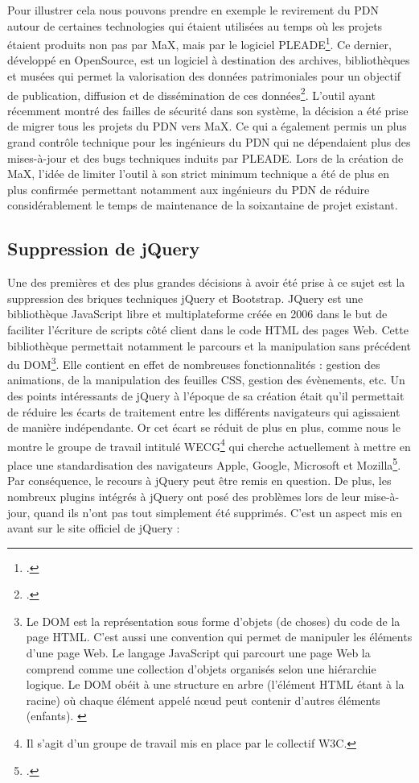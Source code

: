 \documentclass[a4paper,12pt,twoside]{book}
\begin{document}
Pour illustrer cela nous pouvons prendre en exemple le revirement du \acrshort{PDN} autour de certaines technologies qui étaient utilisées au temps où les projets étaient produits non pas par MaX, mais par le logiciel PLEADE\footcite{pleade}. Ce dernier, développé en OpenSource, est un logiciel à destination des archives, bibliothèques et musées qui permet la valorisation des données patrimoniales pour un objectif de publication, diffusion et de dissémination de ces données\footcite{pleade}. L'outil ayant récemment montré des failles de sécurité dans son système, la décision a été prise de migrer tous les projets du \acrshort{PDN} vers MaX. Ce qui a également permis un plus grand contrôle technique pour les ingénieurs du \acrshort{PDN} qui ne dépendaient plus des mises-à-jour et des bugs techniques induits par PLEADE. Lors de la création de MaX, l'idée de limiter l'outil à son strict minimum technique a été de plus en plus confirmée permettant notamment aux ingénieurs du \acrshort{PDN} de réduire considérablement le temps de maintenance de la soixantaine de projet existant.

\subsection{Suppression de jQuery}
Une des premières et des plus grandes décisions à avoir été prise à ce sujet est la suppression des briques techniques jQuery et Bootstrap. JQuery est une bibliothèque JavaScript libre et multiplateforme créée en 2006 dans le but de faciliter l'écriture de scripts côté client dans le code \acrshort{HTML} des pages Web. Cette bibliothèque permettait notamment le parcours et la manipulation sans précédent du \acrfull{DOM}\footnote{Le DOM est la représentation sous forme d'objets (de choses) du code de la page \acrshort{HTML}. C'est aussi une convention qui permet de manipuler les éléments d'une page Web. Le langage JavaScript qui parcourt une page Web la comprend comme une collection d'objets organisés selon une hiérarchie logique. Le DOM obéit à une structure en arbre (l'élément \acrshort{HTML} étant à la racine) où chaque élément appelé n\oe{}ud peut contenir d'autres éléments (enfants). \cite{dom_2020}}. Elle contient en effet de nombreuses fonctionnalités : gestion des animations, de la manipulation des feuilles CSS, gestion des évènements, etc. Un des points intéressants de jQuery à l'époque de sa création était qu'il permettait de réduire les écarts de traitement entre les différents navigateurs qui agissaient de manière indépendante. Or cet écart se réduit de plus en plus, comme nous le montre le groupe de travail intitulé
\acrfull{WECG}\footnote{Il s'agit d'un groupe de travail mis en place par le collectif W3C.} qui cherche actuellement à mettre en place une standardisation des navigateurs Apple, Google, Microsoft et Mozilla\footcite{webextensions}. Par conséquence, le recours à jQuery peut être remis en question. De plus, les nombreux plugins intégrés à jQuery ont posé des problèmes lors de leur mise-à-jour, quand ils n'ont pas tout simplement été supprimés. C'est un aspect mis en avant sur le site officiel de jQuery :
\end{document}

